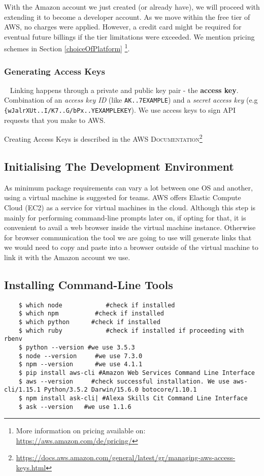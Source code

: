 With the Amazon account we just created (or already have), we will proceed with extending it to become a developer account. As we move within the free tier of AWS, no charges were applied. However, a credit card might be required for eventual future billings if the tier limitations were exceeded. We mention pricing schemes in Section \ref{choiceOfPlatform} \footnote{More information on pricing available on: \url{https://aws.amazon.com/de/pricing/}}. 

\subsubsection*{Generating Access Keys}~\label{accesskeys}
Linking happens through a private and public key pair - the \textbf{access key}.
Combination of an \textit{access key ID} (like \lstinline|AK..7EXAMPLE|) and a \textit{secret access key} (e.g \lstinline|{wJalrXUt..I/K7..G/bPx..YEXAMPLEKEY|). We use access keys to sign API requests that you make to AWS.

Creating Access Keys is described in the \textsc{AWS Documentation}\footnote{\url{https://docs.aws.amazon.com/general/latest/gr/managing-aws-access-keys.html}}


\subsection*{Initialising The Development Environment}

As minimum package requirements can vary a lot between one OS and another, using a virtual machine is suggested for teams. AWS offers Elastic Compute Cloud (EC2) as a service for virtual machines in the cloud. Although this step is mainly for performing command-line prompts later on, if opting for that, it is convenient to avail a web browser inside the virtual machine instance. Otherwise for browser communication the tool we are going to use will generate links that we would need to copy and paste into a browser outside of the virtual machine to link it with the Amazon account we use.


\subsection*{Installing Command-Line Tools}

\begin{verbatim}
	$ which node			#check if installed
	$ which npm			 #check if installed
	$ which python		#check if installed
	$ which ruby			#check if installed if proceeding with rbenv
	$ python --version #we use 3.5.3
	$ node --version	 #we use 7.3.0
	$ npm --version 	 #we use 4.1.1
	$ pip install aws-cli #Amazon Web Services Command Line Interface
	$ aws --version		#check successful installation. We use aws-cli/1.15.1 Python/3.5.2 Darwin/15.6.0 botocore/1.10.1
	$ npm install ask-cli| #Alexa Skills Cit Command Line Interface
	$ ask --version	  #we use 1.1.6
\end{verbatim}




